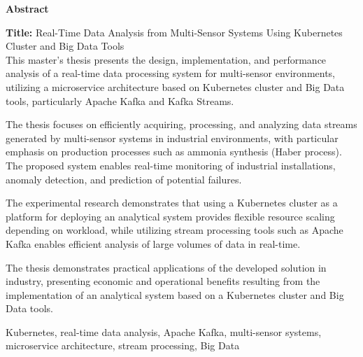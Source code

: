 \begin{abstract_en}
\begin{center}
\textbf{\large Abstract}
\end{center}
\vspace{0.5em}

\noindent\textbf{Title:} Real-Time Data Analysis from Multi-Sensor Systems Using Kubernetes Cluster and Big Data Tools\\

This master's thesis presents the design, implementation, and performance analysis of a real-time data processing system for multi-sensor environments, utilizing a microservice architecture based on Kubernetes cluster and Big Data tools, particularly Apache Kafka and Kafka Streams.

The thesis focuses on efficiently acquiring, processing, and analyzing data streams generated by multi-sensor systems in industrial environments, with particular emphasis on production processes such as ammonia synthesis (Haber process). The proposed system enables real-time monitoring of industrial installations, anomaly detection, and prediction of potential failures.

The experimental research demonstrates that using a Kubernetes cluster as a platform for deploying an analytical system provides flexible resource scaling depending on workload, while utilizing stream processing tools such as Apache Kafka enables efficient analysis of large volumes of data in real-time.

The thesis demonstrates practical applications of the developed solution in industry, presenting economic and operational benefits resulting from the implementation of an analytical system based on a Kubernetes cluster and Big Data tools.

\begin{keywords_en}
Kubernetes, real-time data analysis, Apache Kafka, multi-sensor systems, microservice architecture, stream processing, Big Data
\end{keywords_en}
\end{abstract_en}
